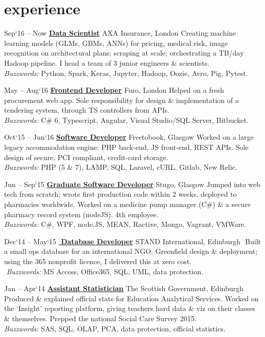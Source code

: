 \documentclass[]{friggeri-cv}
\newcommand{\axaJob}{\href{https://web.archive.org/web/20170113182017/https://www.kaggle.com/jobs/17128/axa-insurance-data-scientist-london}{\textbf{Data Scientist}}}%
\newcommand{\furoJob}{\href{https://web.archive.org/web/20170113184959/https://1.bp.blogspot.com/-8MTHkoAbScc/WHkd2EI0liI/AAAAAAAAC1k/0ZWr2XpO_ewW3Hd1RDHTfv3O_jki3bNigCLcB/s1600/furo.png}{\textbf{\textbf{Frontend Developer}}}}%
\newcommand{\freeJob}{\href{http://web.archive.org/web/20170113190649/http://www.freetobook.com/}{\textbf{Software Developer}}}%
\newcommand{\stugoJob}{\href{http://web.archive.org/web/20170113185418/http://stugo.co.uk/}{\textbf{Graduate Software Developer}}}%
\newcommand{\govJob}{\href{http://web.archive.org/web/20170113190449/http://www.gov.scot/Resource/0047/00478784.pdf}{\textbf{Assistant Statistician}}}%
\newcommand{\standJob}{\href{http://web.archive.org/web/20170113190135/http://standinternational.org/about-us}{\textbf{\,\,Database Developer}}}%
\begin{document}
\section{experience}
\begin{entrylist}
	\smallskip\smallskip
	\entry
	{Sep‘16 – Now}
	{\axaJob{}}
    {AXA Insurance, London}
    {Creating machine learning models (GLMs, GBMs, ANNs) for pricing, medical risk, image recognition on architectural plans; scraping at scale; orchestrating a TB/day Hadoop pipeline. I head a team of 3 junior engineers \& scientists.\\
     \textit{Buzzwords:}	Python, Spark, Keras, Jupyter, Hadoop, Oozie, Avro, Pig, Pytest. }		
    
    \smallskip\smallskip    \smallskip\smallskip \smallskip\smallskip
	\entry
	{May – Aug‘16}
	{\furoJob{}}
    {Furo, London}
    {Helped on a fresh procurement web app. Sole responsibility for design \& implementation of a tendering system, through TS controllers from APIs. \\
    \textit{Buzzwords:}	C\# 6, Typescript, Angular, Visual Studio/SQL Server, Bitbucket. }	
    \smallskip\smallskip\smallskip\smallskip \smallskip\smallskip
    
    \entry
	{Oct‘15 – Jun‘16}
	{\freeJob{}}
    {Freetobook, Glasgow}
    { Worked on a large legacy accommodation engine: PHP back-end, JS front-end, REST APIs.
    Sole design of secure, PCI compliant, credit-card storage. \\
	\textit{Buzzwords:}	PHP (5 \& 7), LAMP, SQL, Laravel, cURL, Gitlab, New Relic. }	
	\smallskip\smallskip	\smallskip\smallskip	\smallskip\smallskip
	
	\entry
	{Jun – Sep‘15}
	{\stugoJob{}}
    {Stugo, Glasgow}
    { Jumped into web tech from scratch; wrote first production code within 2 weeks, deployed to pharmacies worldwide. Worked on a medicine pump manager (C\#) \& a secure pharmacy record system (nodeJS). 4th employee. 
    \\
	\textit{Buzzwords:}	C\#, WPF, node.JS, MEAN, Ractive, Mongo, Vagrant, VMWare. }	
	\smallskip\smallskip	\smallskip\smallskip	\smallskip\smallskip
	
	\entry
	{Dec‘14 – May‘15}
	{\standJob{}}
    {STAND International, Edinburgh}
    {\,\,Built a small ops database for an international NGO. Greenfield design \& deployment; using the 365 nonprofit licence, I delivered this at zero cost. \\
	\,\,\textit{Buzzwords:}	MS Access, Office365, SQL, UML, data protection. }
	\smallskip\smallskip	\smallskip\smallskip	\smallskip\smallskip
	
	\entry
	{Jan – Apr‘14}
	{\govJob{}}
    {The Scottish Government, Edinburgh}
    {Produced \& explained official stats for Education Analytical Services. Worked on the `Insight' reporting platform, giving teachers hard data \& viz on their classes \& themselves. Prepped the national Social Care Survey 2015. \\
	\textit{Buzzwords:}	SAS, SQL, OLAP, PCA, data protection, official statistics. }\\
\end{entrylist}
% 
\\\\
\end{document}
